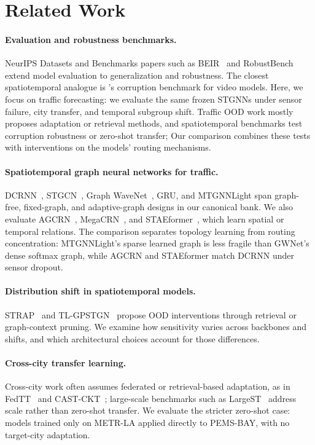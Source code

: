 \section{Related Work}
\label{sec:related}

\paragraph{Evaluation and robustness benchmarks.}
NeurIPS Datasets and Benchmarks papers such as BEIR~\citep{thakur2021beir}
and RobustBench~\citep{croce2021robustbench} extend model evaluation to
generalization and robustness. The closest spatiotemporal
analogue is \citet{yi2021benchmarking}'s corruption benchmark for video
models. Here, we focus on traffic forecasting: we evaluate the same frozen STGNNs under sensor failure, city transfer, and temporal subgroup shift.
Traffic OOD work mostly proposes adaptation or retrieval methods, and
spatiotemporal benchmarks test corruption robustness or zero-shot transfer;
Our comparison combines these tests with interventions on the models' routing mechanisms.

\paragraph{Spatiotemporal graph neural networks for traffic.}
DCRNN~\citep{li2018dcrnn}, STGCN~\citep{yu2018stgcn}, Graph
WaveNet~\citep{wu2019gwnet}, GRU, and MTGNNLight span graph-free, fixed-graph,
and adaptive-graph designs in our canonical bank. We also evaluate
AGCRN~\citep{bai2020agcrn}, MegaCRN~\citep{jiang2023megacrn}, and
STAEformer~\citep{liu2023staeformer}, which learn spatial or temporal relations. The comparison separates topology
learning from routing concentration: MTGNNLight's sparse learned graph is less
fragile than GWNet's dense softmax graph, while AGCRN and STAEformer match
DCRNN under sensor dropout.

\paragraph{Distribution shift in spatiotemporal models.}

STRAP~\citep{zhang2025strap} and TL-GPSTGN~\citep{jing2026tlgpstgn} propose
OOD interventions through retrieval or graph-context pruning. We examine how
sensitivity varies across backbones and shifts, and which architectural choices
account for those differences.

\paragraph{Cross-city transfer learning.}
Cross-city work often assumes federated or retrieval-based adaptation,
as in FedTT~\citep{zeng2025fedtt} and CAST-CKT~\citep{fofanah2026castckt};
large-scale benchmarks such as LargeST~\citep{liu2023largest} address scale
rather than zero-shot transfer. We evaluate the stricter zero-shot case:
models trained only on METR-LA applied directly to PEMS-BAY, with no
target-city adaptation.

